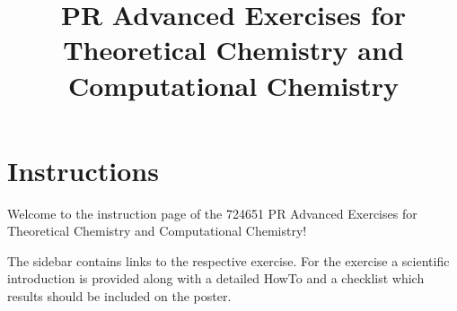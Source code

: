 \documentclass[
  letterpaper,
  DIV=11,
  numbers=noendperiod]{scrreprt}
\title{PR Advanced Exercises for Theoretical Chemistry and Computational
Chemistry}
\author{}
\date{}
\makeatletter
\renewcommand{\maketitle}{\bgroup\setlength{\parindent}{0pt}
\begin{flushleft}
  {\sffamily\huge\textbf{\MakeUppercase{\@title}}} \vspace{0.3cm} \newline
  {\Large {\@subtitle}} \newline
  \@author
\end{flushleft}\egroup
}
\makeatother
\begin{document}
\maketitle
\pagestyle{mystyle}

\ifdefined\Shaded\renewenvironment{Shaded}{\begin{tcolorbox}[boxrule=0pt, frame hidden, enhanced, colback={shadecolor}, breakable]}{\end{tcolorbox}}\fi


\hypertarget{instructions}{%
\chapter{Instructions}\label{instructions}}

Welcome to the instruction page of the 724651 PR Advanced Exercises for
Theoretical Chemistry and Computational Chemistry!

The sidebar contains links to the respective exercise. For the exercise
a scientific introduction is provided along with a detailed HowTo and a
checklist which results should be included on the poster.
\end{document}
